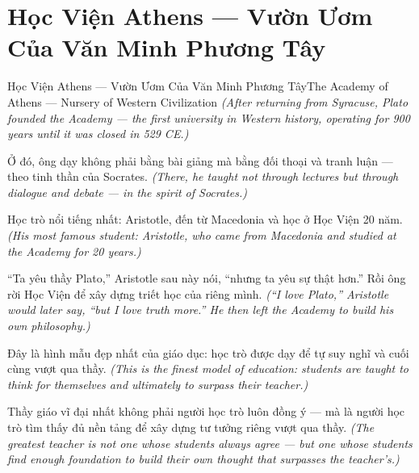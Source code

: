 \section{Học Viện Athens — Vườn Ươm Của Văn Minh Phương Tây}
\begin{truyen}{Học Viện Athens — Vườn Ươm Của Văn Minh Phương Tây}{The Academy of Athens — Nursery of Western Civilization}
\textit{(After returning from Syracuse, Plato founded the Academy — the first university in Western history, operating for 900 years until it was closed in 529 CE.)}

Ở đó, ông dạy không phải bằng bài giảng mà bằng đối thoại và tranh luận — theo tinh thần của Socrates.
\textit{(There, he taught not through lectures but through dialogue and debate — in the spirit of Socrates.)}

Học trò nổi tiếng nhất: Aristotle, đến từ Macedonia và học ở Học Viện 20 năm.
\textit{(His most famous student: Aristotle, who came from Macedonia and studied at the Academy for 20 years.)}

``Ta yêu thầy Plato,'' Aristotle sau này nói, ``nhưng ta yêu sự thật hơn.'' Rồi ông rời Học Viện để xây dựng triết học của riêng mình.
\textit{(``I love Plato,'' Aristotle would later say, ``but I love truth more.'' He then left the Academy to build his own philosophy.)}

Đây là hình mẫu đẹp nhất của giáo dục: học trò được dạy để tự suy nghĩ và cuối cùng vượt qua thầy.
\textit{(This is the finest model of education: students are taught to think for themselves and ultimately to surpass their teacher.)}

\end{truyen}

\begin{baihoc}
Thầy giáo vĩ đại nhất không phải người học trò luôn đồng ý — mà là người học trò tìm thấy đủ nền tảng để xây dựng tư tưởng riêng vượt qua thầy.
\textit{(The greatest teacher is not one whose students always agree — but one whose students find enough foundation to build their own thought that surpasses the teacher's.)}
\end{baihoc}
